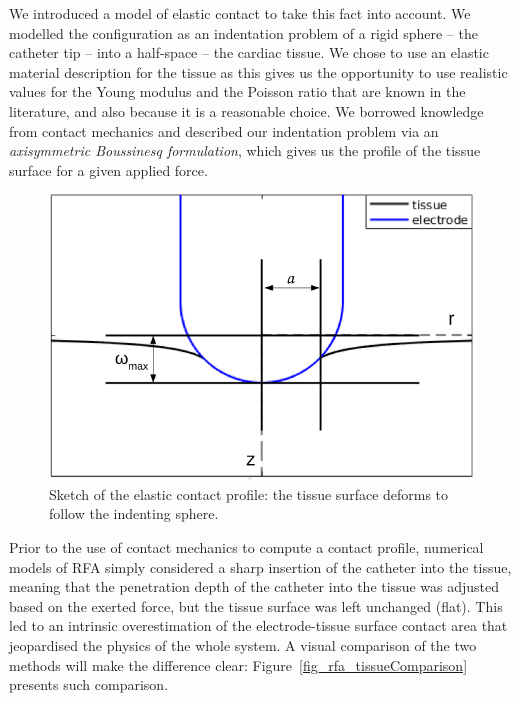 We introduced a model of elastic contact to take this fact into account.
We modelled the configuration as an indentation problem of a rigid sphere -- the catheter tip -- into a half-space -- the cardiac tissue.
We chose to use an elastic material description for the tissue as this gives us the opportunity to use realistic values for the Young modulus and the Poisson ratio that are known in the literature, and also because it is a reasonable choice.
We borrowed knowledge from contact mechanics and described our indentation problem via an \emph{axisymmetric Boussinesq formulation}, which gives us the profile of the tissue surface for a given applied force. 
\begin{figure}
  \centering
    \includegraphics[width=0.75\columnwidth]{img/rfa/crossSectionContact}
    \caption{Sketch of the elastic contact profile: the tissue surface deforms to follow the indenting sphere.}
    \label{fig_rfa_crossSectionContact}
\end{figure}
Prior to the use of contact mechanics to compute a contact profile, numerical models of RFA simply considered a sharp insertion of the catheter into the tissue, meaning that the penetration depth of the catheter into the tissue was adjusted based on the exerted force, but the tissue surface was left unchanged (flat).
This led to an intrinsic overestimation of the electrode-tissue surface contact area that jeopardised the physics of the whole system.
A visual comparison of the two methods will make the difference clear: Figure~\ref{fig_rfa_tissueComparison} presents such comparison.
